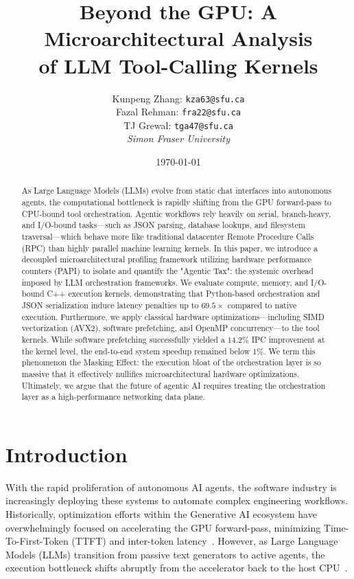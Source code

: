 \documentclass[10pt, letterpaper]{article}
\title{\textbf{Beyond the GPU: A Microarchitectural Analysis \\ \large of LLM Tool-Calling Kernels}}
\author{
    Kunpeng Zhang: \texttt{kza63@sfu.ca} \\
    Fazal Rehman: \texttt{fra22@sfu.ca} \\
    TJ Grewal: \texttt{tga47@sfu.ca} \\
    \vspace{0.5em}
    \textit{Simon Fraser University}
}
\date{\today}
\begin{document}
\maketitle

\begin{abstract}
\noindent As Large Language Models (LLMs) evolve from static chat interfaces into autonomous agents, the computational bottleneck is rapidly shifting from the GPU forward-pass to CPU-bound tool orchestration. Agentic workflows rely heavily on serial, branch-heavy, and I/O-bound tasks---such as JSON parsing, database lookups, and filesystem traversal---which behave more like traditional datacenter Remote Procedure Calls (RPC) than highly parallel machine learning kernels. In this paper, we introduce a decoupled microarchitectural profiling framework utilizing hardware performance counters (PAPI) to isolate and quantify the "Agentic Tax": the systemic overhead imposed by LLM orchestration frameworks. We evaluate compute, memory, and I/O-bound C++ execution kernels, demonstrating that Python-based orchestration and JSON serialization induce latency penalties up to $69.5\times$ compared to native execution. Furthermore, we apply classical hardware optimizations---including SIMD vectorization (AVX2), software prefetching, and OpenMP concurrency---to the tool kernels. While software prefetching successfully yielded a $14.2\%$ IPC improvement at the kernel level, the end-to-end system speedup remained below $1\%$. We term this phenomenon the Masking Effect: the execution bloat of the orchestration layer is so massive that it effectively nullifies microarchitectural hardware optimizations. Ultimately, we argue that the future of agentic AI requires treating the orchestration layer as a high-performance networking data plane.
\end{abstract}

\section{Introduction}
\label{sec:introduction}

With the rapid proliferation of autonomous AI agents, the software industry is increasingly deploying these systems to automate complex engineering workflows. Historically, optimization efforts within the Generative AI ecosystem have overwhelmingly focused on accelerating the GPU forward-pass, minimizing Time-To-First-Token (TTFT) and inter-token latency~\cite{data_systems, sutradhara}. However, as Large Language Models (LLMs) transition from passive text generators to active agents, the execution bottleneck shifts abruptly from the accelerator back to the host CPU~\cite{cpu_centric}. \\
\end{document}
